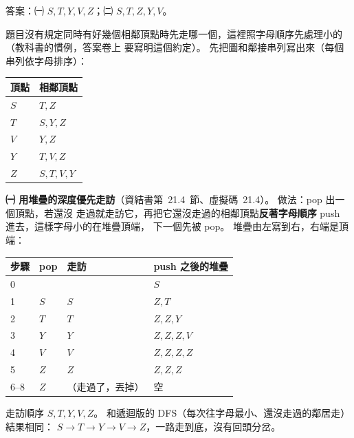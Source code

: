 \begin{pastsoln}
答案：㈠ $S, T, Y, V, Z$；㈡ $S, T, Z, Y, V$。

題目沒有規定同時有好幾個相鄰頂點時先走哪一個，這裡照字母順序先處理小的（教科書的慣例，答案卷上
要寫明這個約定）。 先把圖和鄰接串列寫出來（每個串列依字母排序）：
\begin{center}
\qquad
\begin{tabular}[b]{ll}
\toprule
頂點 & 相鄰頂點 \\
\midrule
$S$ & $T, Z$ \\
$T$ & $S, Y, Z$ \\
$V$ & $Y, Z$ \\
$Y$ & $T, V, Z$ \\
$Z$ & $S, T, V, Y$ \\
\bottomrule
\end{tabular}
\end{center}

\textbf{㈠ 用堆疊的深度優先走訪}（資結書第~21.4~節、虛擬碼~21.4）。 做法：pop 出一個頂點，若還沒
走過就走訪它，再把它還沒走過的相鄰頂點\textbf{反著字母順序} push 進去，這樣字母小的在堆疊頂端，
下一個先被 pop。 堆疊由左寫到右，右端是頂端：
\begin{center}
\begin{tabular}{llll}
\toprule
步驟 & pop & 走訪 & push 之後的堆疊 \\
\midrule
0 & & & $S$ \\
1 & $S$ & $S$ & $Z, T$ \\
2 & $T$ & $T$ & $Z, Z, Y$ \\
3 & $Y$ & $Y$ & $Z, Z, Z, V$ \\
4 & $V$ & $V$ & $Z, Z, Z, Z$ \\
5 & $Z$ & $Z$ & $Z, Z, Z$ \\
6--8 & $Z$ & （走過了，丟掉） & 空 \\
\bottomrule
\end{tabular}
\end{center}
走訪順序 $S, T, Y, V, Z$。 和遞迴版的 DFS（每次往字母最小、還沒走過的鄰居走）結果相同：
$S \to T \to Y \to V \to Z$，一路走到底，沒有回頭分岔。


\end{pastsoln}
